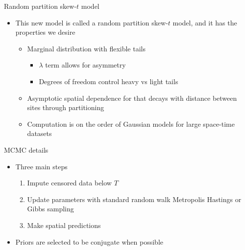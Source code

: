 \documentclass{beamer}
\begin{document}
\begin{frame}{Random partition skew-$t$ model}
  \begin{itemize} \setlength{\itemsep}{1em}
    \item This new model is called a random partition skew-$t$ model, and it has the properties we desire
    \begin{itemize}
      \item Marginal distribution with flexible tails
      \begin{itemize}
        \item $\lambda$ term allows for asymmetry
        \item Degrees of freedom control heavy vs light tails
      \end{itemize}
      \item Asymptotic spatial dependence for that decays with distance between sites through partitioning
      \item Computation is on the order of Gaussian models for large space-time datasets
    \end{itemize}
  \end{itemize}
\end{frame}




\begin{frame}{MCMC details}
  \begin{itemize} \setlength{\itemsep}{1em}
    \item Three main steps
    \begin{enumerate}[1.]
      \item Impute censored data below $T$
      \item Update parameters with standard random walk Metropolis Hastings or Gibbs sampling
      \item Make spatial predictions
    \end{enumerate}
    \item Priors are selected to be conjugate when possible
  \end{itemize}
\end{frame}
\end{document}
